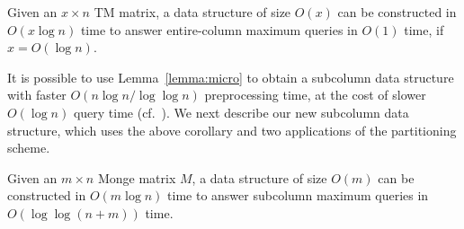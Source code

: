\documentclass{llncs}
\begin{document}
\begin{corollary}\label{lem:micro}
Given an $x\times n$ TM matrix, a data structure of size $O(x)$ can be constructed in
$O(x \log n)$ time to answer entire-column maximum queries  in $O(1)$ time, if $x=O(\log n)$.
\end{corollary}

It is possible to use Lemma~\ref{lemma:micro} to obtain a subcolumn data
structure with faster $O(n \log n / \log\log n)$ preprocessing time,
at the cost of slower $O(\log n)$ query time (cf.~\cite[Lemma
2]{ourICALP}).  We next describe our new subcolumn data structure, which uses the above corollary and two applications of
the partitioning scheme.


















\begin{theorem}
\label{thm:subcolumn2}
Given an $m\times n$ Monge matrix $M$, a data structure of size $O(m)$ can be constructed
in $O(m\log n)$ time to answer subcolumn maximum queries in $O(\log\log (n+m))$ time.
\end{theorem}
\end{document}
